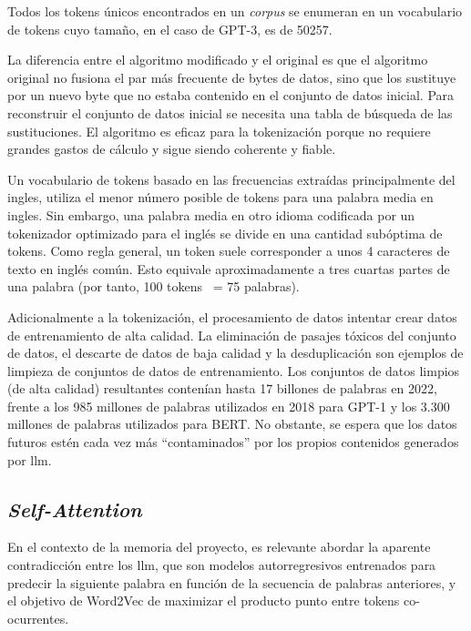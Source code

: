 Todos los tokens únicos encontrados en un \textit{corpus} se enumeran en un vocabulario de tokens cuyo tamaño, en el caso de GPT-3, es de 50257.

La diferencia entre el algoritmo modificado y el original es que el algoritmo original no fusiona el par más frecuente de bytes de datos, sino que los sustituye por un nuevo byte que no estaba contenido en el conjunto de datos inicial. Para reconstruir el conjunto de datos inicial se necesita una tabla de búsqueda de las sustituciones. El algoritmo es eficaz para la tokenización porque no requiere grandes gastos de cálculo y sigue siendo coherente y fiable.


Un vocabulario de tokens basado en las frecuencias extraídas principalmente del ingles, utiliza el menor número posible de tokens para una palabra media en ingles. Sin embargo, una palabra media en otro idioma codificada por un tokenizador optimizado para el inglés se divide en una cantidad subóptima de tokens. Como regla general, un token suele corresponder a unos 4 caracteres de texto en inglés común. Esto equivale aproximadamente a tres cuartas partes de una palabra (por tanto, 100 tokens ~= 75 palabras).

Adicionalmente a la tokenización, el procesamiento de datos intentar crear datos de entrenamiento de alta calidad. La eliminación de pasajes tóxicos del conjunto de datos, el descarte de datos de baja calidad y la desduplicación son ejemplos de limpieza de conjuntos de datos de entrenamiento. Los conjuntos de datos limpios (de alta calidad) resultantes contenían hasta 17 billones de palabras en 2022, frente a los 985 millones de palabras utilizados en 2018 para GPT-1 y los 3.300 millones de palabras utilizados para BERT. No obstante, se espera que los datos futuros estén cada vez más ``contaminados'' por los propios contenidos generados por \acrshort{llm}.

\subsection{\textit{Self-Attention}}

En el contexto de la memoria del proyecto, es relevante abordar la aparente contradicción entre los \acrfull{llm}, que son modelos autorregresivos entrenados para predecir la siguiente palabra en función de la secuencia de palabras anteriores, y el objetivo de Word2Vec de maximizar el producto punto entre tokens co-ocurrentes.

